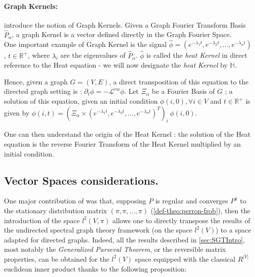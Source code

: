 \documentclass{article}
\begin{document}
\paragraph{Graph Kernels:} \label{par:graph_kernel}

\cite{shuman_narang_frossard_ortega_vandergheynst_2013} introduce the notion of Graph Kernels. Given a Graph Fourier Transform Basis $\hat{P}_\alpha$, a graph Kernel is a vector defined directly in the Graph Fourier Space. \\
One important example of Graph Kernel is the signal $\hat{\phi} = (e^{-\lambda_1 t}, e^{-\lambda_2 t}, \hdots, e^{-\lambda_n t})$, $t \in \mathbb{R^+}$, where $\lambda_i$ are the eigenvalues of $\hat{P}_\alpha$.
$\hat{\phi}$ is called the \textit{heat Kernel} in direct reference to the Heat equation - we will now designate the \textit{heat Kernel} by $\mathbb{H}$.

Hence, given a graph $G=(V,E)$, a direct transposition of this equation to the directed graph setting is : $\partial_{t} \phi = - \mathcal{L}^{rw} \phi$. Let $\Xi_\alpha$ be a Fourier Basis of $G$ ; a solution of this equation, given an initial condition $\phi(i,0), \forall i \in V$ and $t \in \mathbb{R}^+$ is given by $\phi(i, t) = (\Xi_\alpha \times (e^{-\lambda_1 t}, e^{-\lambda_2 t}, \hdots, e^{-\lambda_n t})^T)_i \ \phi(i, 0)$. 

One can then understand the origin of the Heat Kernel : the solution of the Heat equation is the reverse Fourier Transform of the Heat Kernel multiplied by an initial condition.


\subsection{Vector Spaces considerations.}\label{subsec:vector_spaces_relation}
One major contribution of \cite{sevi2019} was that, supposing $P$ is regular and converges $P^k$ to the stationary distribution matrix $(\pi, \pi, \hdots, \pi)$ (\ref{def-theo:perron-frob}), then the introduction of the space $l^2(V, \pi)$ allows one to directly transpose the results of the undirected spectral graph theory framework (on the space $l^2(V)$) to a space adapted for directed graphs. Indeed, all the results described in \ref{sec:SGTIntro}, most notably the \textit{Generalized Parseval Theorem}, or the reversible matrix properties, can be obtained for the $l^2(V)$ space equipped with the classical $R^{|V|}$ euclidean inner product thanks to the following proposition: 
\end{document}
